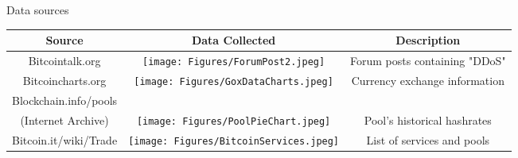 \documentclass{beamer}
\begin{document}
\begin{frame}{Data sources}
\begin{adjustwidth}{-9.5mm}{}
\begin{tabular}{|c|c|c|}
	\hline
	\textbf{Source} & \textbf{Data Collected} & \textbf{Description}\\
	\hline
	Bitcointalk.org &  \texttt{[image: Figures/ForumPost2.jpeg]} & Forum posts containing "DDoS"\\
	\hline
	Bitcoincharts.org & \texttt{[image: Figures/GoxDataCharts.jpeg]} & Currency exchange information\\
	\hline
	Blockchain.info/pools &&\\\small(Internet Archive) & \texttt{[image: Figures/PoolPieChart.jpeg]} & Pool's historical hashrates\\
	\hline
	Bitcoin.it/wiki/Trade & \texttt{[image: Figures/BitcoinServices.jpeg]} & List of services and pools\\
	\hline
\end{tabular}
\end{adjustwidth}



\end{frame}
\end{document}
